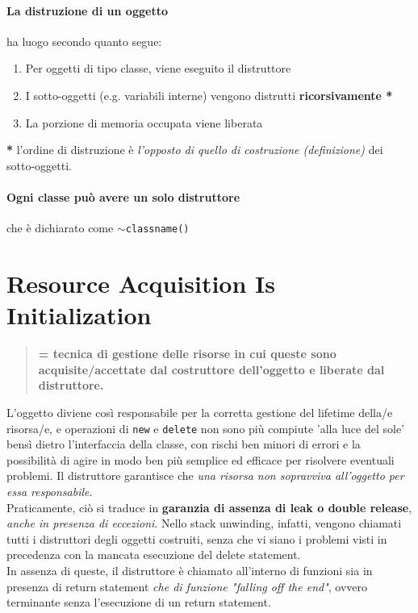 \documentclass[10pt, oneside]{book}
\begin{document}
\paragraph{La distruzione di un oggetto} ha luogo secondo quanto segue:
\begin{enumerate}
\item Per oggetti di tipo classe, viene eseguito il distruttore
\item I sotto-oggetti (e.g. variabili interne) vengono distrutti \textbf{ricorsivamente *}
\item La porzione di memoria occupata viene liberata
\end{enumerate}
\textbf{*} l'ordine di distruzione è \textit{l'opposto di quello di costruzione (definizione)} dei sotto-oggetti.

\paragraph{Ogni classe può avere un solo distruttore} che è dichiarato come \texttt{$\sim$classname()}

\section{Resource Acquisition Is Initialization}
\begin{quote}

\textbf{= tecnica di gestione delle risorse in cui queste sono acquisite/accettate dal costruttore dell'oggetto e liberate dal distruttore.}

\end{quote}
L'oggetto diviene così responsabile per la corretta gestione del lifetime della/e risorsa/e, e operazioni di \texttt{new} e \texttt{delete} non sono più compiute 'alla luce del sole' bensì dietro l'interfaccia della classe, con rischi ben minori di errori e la possibilità di agire in modo ben più semplice ed efficace per risolvere eventuali problemi. Il distruttore garantisce che \textit{una risorsa non sopravviva all'oggetto per essa responsabile}.\\
Praticamente, ciò si traduce in \textbf{garanzia di assenza di leak o double release}, \textit{anche in presenza di eccezioni}. Nello stack unwinding, infatti, vengono chiamati tutti i distruttori degli oggetti costruiti, senza che vi siano i problemi visti in precedenza con la mancata esecuzione del delete statement.\\
In assenza di queste, il distruttore è chiamato all'interno di funzioni sia in presenza di return statement \textit{che di funzione "falling off the end"}, ovvero terminante senza l'esecuzione di un return statement.
\end{document}

